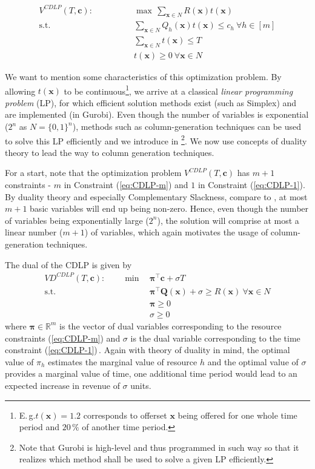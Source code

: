 \begin{align}
V^{CDLP}(T, \boldsymbol{c}): \qquad\qquad & \max\, \sum_{\boldsymbol{x}\in N} R(\boldsymbol{x}) t(\boldsymbol{x})\label{eq:CDLP}\\
\text{s.t. } & \sum_{\boldsymbol{x}\in N} Q_h(\boldsymbol{x}) t(\boldsymbol{x}) \leq c_h ~\forall h \in [m]\label{eq:CDLP-m}\\
& \sum_{\boldsymbol{x}\in N} t(\boldsymbol{x}) \leq T\label{eq:CDLP-1}\\
& t(\boldsymbol{x}) \geq 0 ~\forall \boldsymbol{x} \in N
\end{align}

We want to mention some characteristics of this optimization problem. By allowing $t(\boldsymbol{x})$ to be continuous\footnote{E.\,g.\xspace $t(\boldsymbol{x})=1.2$ corresponds to offerset $\boldsymbol{x}$ being offered for one whole time period and $20\,\%$ of another time period.}, we arrive at a classical \emph{linear programming problem} (LP), for which efficient solution methods exist (such as Simplex) and are implemented (\eg in Gurobi). Even though the number of variables is exponential ($2^n$ as $N = \{0,1\}^n$), methods such as column-generation techniques can be used to solve this LP efficiently and we introduce in \footnote{Note that Gurobi is high-level and thus programmed in such way so that it realizes which method shall be used to solve a given LP efficiently.}. We now use concepts of duality theory to lead the way to column generation techniques.

For a start, note that the optimization problem $V^{CDLP}(T, \boldsymbol{c})$ has $m+1$ constraints - $m$ in Constraint (\ref{eq:CDLP-m}) and $1$ in Constraint (\ref{eq:CDLP-1}). By duality theory and especially Complementary Slackness, compare \eg to \cite{Domschke.2015}, at most $m+1$ basic variables will end up being non-zero. Hence, even though the number of variables being exponentially large ($2^n$), the solution will comprise at most a linear number ($m+1$) of variables, which again motivates the usage of column-generation techniques.

The dual of the CDLP is given by
\begin{align}
	VD^{CDLP}(T, \boldsymbol{c}): \qquad \min\, &\boldsymbol{\pi}^\intercal \boldsymbol{c} + \sigma T\\
	\text{s.t. } &\boldsymbol{\pi}^\intercal \boldsymbol{Q}(\boldsymbol{x}) + \sigma \geq R(\boldsymbol{x}) ~\forall \boldsymbol{x}\in N\\
	& \boldsymbol{\pi} \geq 0\\
	& \sigma \geq 0 
\end{align}
where $\boldsymbol{\pi} \in \mathbb{R}^m$ is the vector of dual variables corresponding to the resource constraints (\ref{eq:CDLP-m}) and $\sigma$ is the dual variable corresponding to the time constraint (\ref{eq:CDLP-1})\,. Again with theory of duality in mind, the optimal value of $\pi_h$ estimates the marginal value of resource $h$ and the optimal value of $\sigma$ provides a marginal value of time, \ie one additional time period would lead to an expected increase in revenue of $\sigma$ units.

